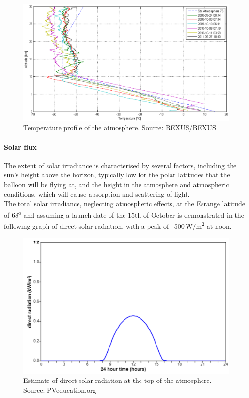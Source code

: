 	\begin{figure}[h!]
    \centering
    \includegraphics[scale=0.6]{4-experiment-design/img/mechanical/atmosphere.PNG}
	\caption{Temperature profile of the atmosphere. Source: REXUS/BEXUS}
	\label{fig:atmosphere}
	\end{figure}



\paragraph{Solar flux}

The extent of solar irradiance is characterised by several factors, including the sun’s height above the horizon, typically low for the polar latitudes that the balloon will be flying at, and the height in the atmosphere and atmospheric conditions, which will cause absorption and scattering of light. \\
The total solar irradiance, neglecting atmospheric effects, at the Esrange latitude of 68\textsuperscript{o} and assuming a launch date of the 15th of October is demonstrated in the following graph of direct solar radiation, with a peak of ~500\,W/m\textsuperscript{2} at noon.\\

	\begin{figure}[h!]
    \centering
    \includegraphics[scale=0.6]{4-experiment-design/img/mechanical/directradiation.png}
	\caption{Estimate of direct solar radiation at the top of the atmosphere. Source: PVeducation.org}
	\label{fig:directradiation}
	\end{figure}

